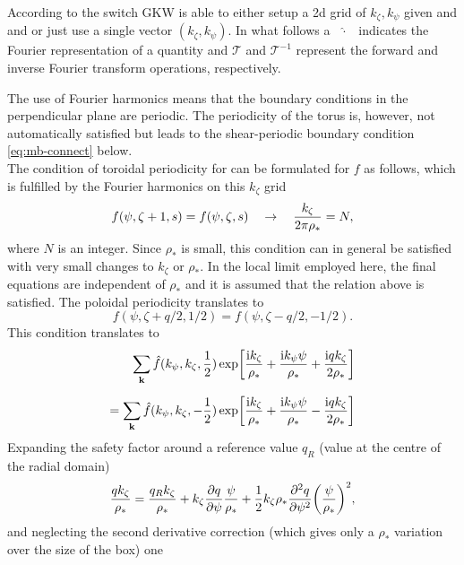 According to the switch  GKW is able to either setup a 2d grid of $k_\zeta,k_\psi$ given  and  and or just use a single vector $(k_\zeta,k_\psi)$.
In what follows a ~$\widehat\cdot$~ indicates the Fourier representation of a quantity and ${\mathcal T}$ and ${\mathcal T}^{-1}$ 
represent the forward and inverse Fourier transform  operations, respectively.  

The use of Fourier harmonics means that the boundary conditions in the perpendicular plane are periodic.  
The periodicity of the torus is, however, not automatically satisfied but leads to the shear-periodic boundary condition \eqref{eq:mb-connect} below.\\
The condition of toroidal periodicity for can be formulated for $f$ as follows, which is fulfilled by the Fourier harmonics on this $k_\zeta$ grid
\begin{equation} 
f(\psi,\zeta+ 1,s) = f(\psi,\zeta,s)  \quad \rightarrow \quad
{k_\zeta \over 2 \pi \rho_*} = N , 
\end{equation}
where $N$ is an integer. 
Since $\rho_*$ is small, this condition can in general be satisfied with very small changes to $k_\zeta$ or $\rho_*$. 
In the local limit employed here, the final equations are independent of $\rho_*$ and it 
is assumed that the relation above is satisfied. 
The poloidal periodicity translates to
\begin{equation} 
f(\psi,\zeta + q/2, 1/2) = f(\psi,\zeta- q/2,-1/2) .
\end{equation}
This condition translates to 
\begin{align}
\sum_{\bf k} \hat f( k_\psi, k_\zeta, {1 \over 2} ) \exp \biggl [ {{\rm i} k_\zeta \over \rho_*} + {{\rm i} k_\psi 
\psi \over \rho_*} + {{\rm i} q k_\zeta \over 2 \rho_*} \biggr ] \cr 
\noalign{\vskip 0.2 truecm} 
= \sum_{\bf k} \hat f ( k_\psi, k_\zeta, - {1 \over 2} )
 \exp \biggl [ {{\rm i} k_\zeta \over \rho_*} + {{\rm i} k_\psi 
\psi \over \rho_*} - {{\rm i} q k_\zeta \over 2 \rho_*} \biggr ]
\end{align}
Expanding the safety factor around a reference value $q_R$ (value at the centre of the radial domain) 
\begin{equation} 
{q k_\zeta \over \rho_*} = {q_R k_\zeta \over \rho_*} + k_\zeta \frac{\partial  q}{\partial \psi}{\psi \over \rho_*} 
+ {1 \over 2} k_\zeta \rho_* \frac{\partial^2 q}{\partial \psi^2} \biggl ( {\psi \over \rho_*} \biggr )^2 ,
\end{equation}
and neglecting the second derivative correction (which gives only a $\rho_*$ variation over the size of the box) one 
